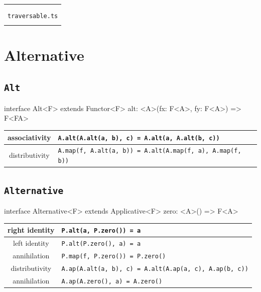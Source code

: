 \documentclass[12pt]{article}
\theoremstyle{definition}
\newenvironment{demo}
    {\begin{center}
    \begin{tabular}{|p{0.9\textwidth}|}
    \hline\\
    }
    {
    \\\\\hline
    \end{tabular}
    \end{center}
    }
\newenvironment{code}
  {\vspace{0.5cm} \VerbatimEnvironment\begin{typescriptcode}}
  {\end{typescriptcode} \vspace{0.2cm}}
\begin{document}
\begin{demo}
\begin{center}
\textbf{DEMO}

\texttt{BinaryTree.ts} \\
\texttt{traversable.ts}
\end{center}
\end{demo}

\newpage

\section{Alternative}

\subsection{\texttt{Alt}}

\begin{code}
interface Alt<F> extends Functor<F> {
  alt: <A>(fx: F<A>, fy: F<A>) => F<FA>
}
\end{code}

\begin{center}
\bgroup
\def\arraystretch{1.5}
\begin{tabular}{ |c|p{10cm}| }
\hline
associativity & \texttt{A.alt(A.alt(a, b), c) = A.alt(a, A.alt(b, c))} \\
\hline
distributivity & \texttt{A.map(f, A.alt(a, b)) = A.alt(A.map(f, a), A.map(f, b))} \\
\hline
\end{tabular}
\egroup
\end{center}

\subsection{\texttt{Alternative}}

\begin{code}
interface Alternative<F> extends Applicative<F> {
  zero: <A>() => F<A>
}
\end{code}

\begin{center}
\bgroup
\def\arraystretch{1.5}
\begin{tabular}{ |c|p{10cm}| }
\hline
right identity & \texttt{P.alt(a, P.zero()) = a} \\
\hline
left identity & \texttt{P.alt(P.zero(), a) = a} \\
\hline
annihilation & \texttt{P.map(f, P.zero()) = P.zero()} \\
\hline
distributivity & \texttt{A.ap(A.alt(a, b), c) = A.alt(A.ap(a, c), A.ap(b, c))} \\
\hline
annihilation & \texttt{A.ap(A.zero(), a) = A.zero()} \\
\hline
\end{tabular}
\egroup
\end{center}
\end{document}
